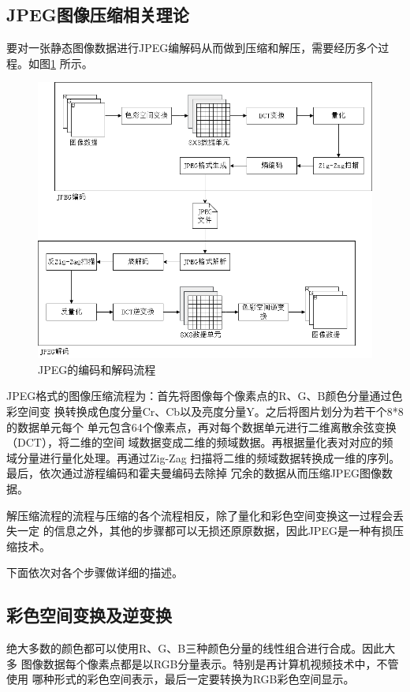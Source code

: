 \documentclass{article}
\numberwithin {equation}{section}
\begin{document}
\begin{spacing}{1.25}
\newpage
\section{JPEG图像压缩相关理论}
  要对一张静态图像数据进行JPEG编解码从而做到压缩和解压，需要经历多个过程。如图\ref{jpeg}
  所示。
  \begin{figure}[H]
    \centering
    \includegraphics[scale=0.45]{./pictures/编解码流程.png}
    \caption{JPEG的编码和解码流程}\label{jpeg}
  \end{figure}
  JPEG格式的图像压缩流程为：首先将图像每个像素点的R、G、B颜色分量通过色彩空间变
  换转换成色度分量Cr、Cb以及亮度分量Y。之后将图片划分为若干个8*8的数据单元每个
  单元包含64个像素点，再对每个数据单元进行二维离散余弦变换（DCT），将二维的空间
  域数据变成二维的频域数据。再根据量化表对对应的频域分量进行量化处理。再通过Zig-Zag
  扫描将二维的频域数据转换成一维的序列。最后，依次通过游程编码和霍夫曼编码去除掉
  冗余的数据从而压缩JPEG图像数据。

  解压缩流程的流程与压缩的各个流程相反，除了量化和彩色空间变换这一过程会丢失一定
  的信息之外，其他的步骤都可以无损还原原数据，因此JPEG是一种有损压缩技术。

  下面依次对各个步骤做详细的描述。
  \subsection{彩色空间变换及逆变换}
    \vspace{1em}
    绝大多数的颜色都可以使用R、G、B三种颜色分量的线性组合进行合成。因此大多
    图像数据每个像素点都是以RGB分量表示。特别是再计算机视频技术中，不管使用
    哪种形式的彩色空间表示，最后一定要转换为RGB彩色空间显示。


\end{spacing}
\end{document}
